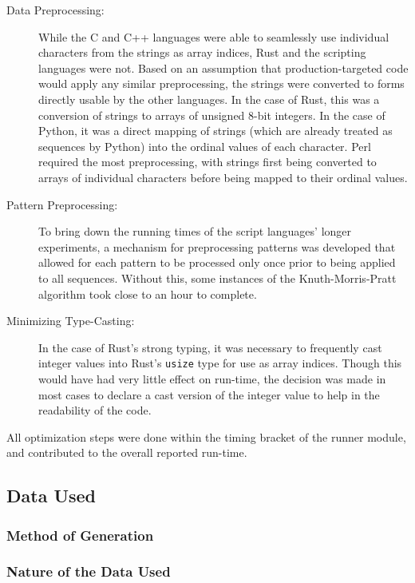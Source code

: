 \begin{description}
\item[Data Preprocessing:] While the C and C++ languages were able to seamlessly use individual characters from the strings as array indices, Rust and the scripting languages were not. Based on an assumption that production-targeted code would apply any similar preprocessing, the strings were converted to forms directly usable by the other languages. In the case of Rust, this was a conversion of strings to arrays of unsigned 8-bit integers. In the case of Python, it was a direct mapping of strings (which are already treated as sequences by Python) into the ordinal values  of each character. Perl required the most preprocessing, with strings first being converted to arrays of individual characters before being mapped to their ordinal values.
\item[Pattern Preprocessing:] To bring down the running times of the script languages' longer experiments, a mechanism for preprocessing patterns was developed that allowed for each pattern to be processed only once prior to being applied to all sequences. Without this, some instances of the Knuth-Morris-Pratt algorithm took close to an hour to complete.
\item[Minimizing Type-Casting:] In the case of Rust's strong typing, it was necessary to frequently cast integer values into Rust's \texttt{usize} type for use as array indices. Though this would have had very little effect on run-time, the decision was made in most cases to declare a cast version of the integer value to help in the readability of the code.
\end{description}

All optimization steps were done within the timing bracket of the runner module, and contributed to the overall reported run-time.

\subsection{Data Used}
\label{subsec:data}

\subsubsection{Method of Generation}

\subsubsection{Nature of the Data Used}

